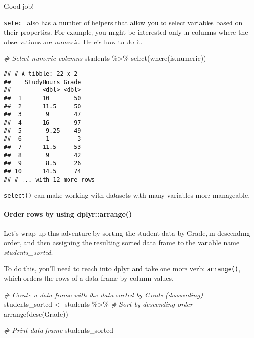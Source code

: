 \documentclass[
]{article}
\newenvironment{Shaded}{\begin{snugshade}}{\end{snugshade}}
\newcommand{\CommentTok}[1]{\textcolor[rgb]{0.56,0.35,0.01}{\textit{#1}}}
\newcommand{\FunctionTok}[1]{\textcolor[rgb]{0.00,0.00,0.00}{#1}}
\newcommand{\NormalTok}[1]{#1}
\newcommand{\OtherTok}[1]{\textcolor[rgb]{0.56,0.35,0.01}{#1}}
\newcommand{\SpecialCharTok}[1]{\textcolor[rgb]{0.00,0.00,0.00}{#1}}
\begin{document}
Good job!

\texttt{select} also has a number of helpers that allow you to select
variables based on their properties. For example, you might be
interested only in columns where the observations are \emph{numeric}.
Here's how to do it:

\begin{Shaded}
\begin{Highlighting}[]
\CommentTok{\# Select numeric columns}
\NormalTok{students }\SpecialCharTok{\%\textgreater{}\%} 
  \FunctionTok{select}\NormalTok{(}\FunctionTok{where}\NormalTok{(is.numeric))}
\end{Highlighting}
\end{Shaded}

\begin{verbatim}
## # A tibble: 22 x 2
##    StudyHours Grade
##         <dbl> <dbl>
##  1      10       50
##  2      11.5     50
##  3       9       47
##  4      16       97
##  5       9.25    49
##  6       1        3
##  7      11.5     53
##  8       9       42
##  9       8.5     26
## 10      14.5     74
## # ... with 12 more rows
\end{verbatim}

\texttt{select()} can make working with datasets with many variables
more manageable.

\hypertarget{order-rows-by-using-dplyrarrange}{%
\paragraph{Order rows by using
dplyr::arrange()}\label{order-rows-by-using-dplyrarrange}}

Let's wrap up this adventure by sorting the student data by Grade, in
descending order, and then assigning the resulting sorted data frame to
the variable name \emph{students\_sorted}.

To do this, you'll need to reach into dplyr and take one more verb:
\texttt{arrange()}, which orders the rows of a data frame by column
values.

\begin{Shaded}
\begin{Highlighting}[]
\CommentTok{\# Create a data frame with the data sorted by Grade (descending)}
\NormalTok{students\_sorted }\OtherTok{\textless{}{-}}\NormalTok{ students }\SpecialCharTok{\%\textgreater{}\%}
  \CommentTok{\# Sort by descending order}
  \FunctionTok{arrange}\NormalTok{(}\FunctionTok{desc}\NormalTok{(Grade))}

\CommentTok{\# Print data frame}
\NormalTok{students\_sorted}
\end{Highlighting}
\end{Shaded}
\end{document}
